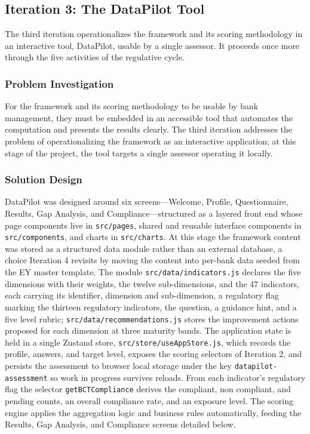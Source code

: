 \subsection{Iteration 3: The DataPilot Tool}

The third iteration operationalizes the framework and its scoring methodology in an interactive tool, DataPilot, usable by a single assessor. It proceeds once more through the five activities of the regulative cycle.

\subsubsection{Problem Investigation}

For the framework and its scoring methodology to be usable by bank management, they must be embedded in an accessible tool that automates the computation and presents the results clearly. The third iteration addresses the problem of operationalizing the framework as an interactive application; at this stage of the project, the tool targets a single assessor operating it locally.

\subsubsection{Solution Design}

\begin{sloppypar}
DataPilot was designed around six screens---Welcome, Profile, Questionnaire, Results, Gap Analysis, and Compliance---structured as a layered front end whose page components live in \texttt{src/pages}, shared and reusable interface components in \texttt{src/components}, and charts in \texttt{src/charts}. At this stage the framework content was stored as a structured data module rather than an external database, a choice Iteration 4 revisits by moving the content into per-bank data seeded from the EY master template. The module \texttt{src/data/indicators.js} declares the five dimensions with their weights, the twelve sub-dimensions, and the 47 indicators, each carrying its identifier, dimension and sub-dimension, a regulatory flag marking the thirteen regulatory indicators, the question, a guidance hint, and a five level rubric; \texttt{src/data/recommendations.js} stores the improvement actions proposed for each dimension at three maturity bands. The application state is held in a single Zustand store, \texttt{src/store/useAppStore.js}, which records the profile, answers, and target level, exposes the scoring selectors of Iteration 2, and persists the assessment to browser local storage under the key \texttt{datapilot-assessment} so work in progress survives reloads. From each indicator's regulatory flag the selector \texttt{getBCTCompliance} derives the compliant, non compliant, and pending counts, an overall compliance rate, and an exposure level. The scoring engine applies the aggregation logic and business rules automatically, feeding the Results, Gap Analysis, and Compliance screens detailed below.
\end{sloppypar}

